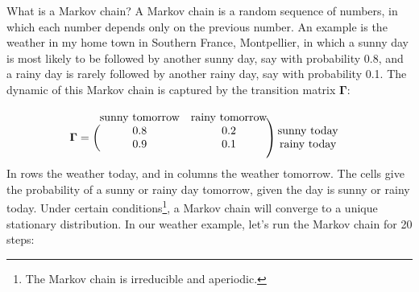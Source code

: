 \documentclass[
  12pt,
]{krantz}
\begin{document}
What is a Markov chain? A Markov chain is a random sequence of numbers, in which each number depends only on the previous number. An example is the weather in my home town in Southern France, Montpellier, in which a sunny day is most likely to be followed by another sunny day, say with probability 0.8, and a rainy day is rarely followed by another rainy day, say with probability 0.1. The dynamic of this Markov chain is captured by the transition matrix \(\mathbf{\Gamma}\):
\[
\begin{matrix}
& \\
\mathbf{\Gamma} = 
    \left ( \vphantom{ \begin{matrix} 12 \\ 12 \end{matrix} } \right .
\end{matrix}
\hspace{-1.2em}
\begin{matrix}
    \text{sunny tomorrow} & \text{rainy tomorrow} \\ 
0.8 & 0.2 \\ 
0.9 & 0.1 \\ 
\end{matrix}
\hspace{-0.2em}
\begin{matrix}
& \\
\left . \vphantom{ \begin{matrix} 12 \\ 12 \\ 12 \end{matrix} } \right )
    \begin{matrix}
    \text{sunny today} \\ \text{rainy today}
    \end{matrix}
\end{matrix}
\]
In rows the weather today, and in columns the weather tomorrow. The cells give the probability of a sunny or rainy day tomorrow, given the day is sunny or rainy today. Under certain conditions\footnote{The Markov chain is irreducible and aperiodic.}, a Markov chain will converge to a unique stationary distribution. In our weather example, let's run the Markov chain for 20 steps:
\end{document}
